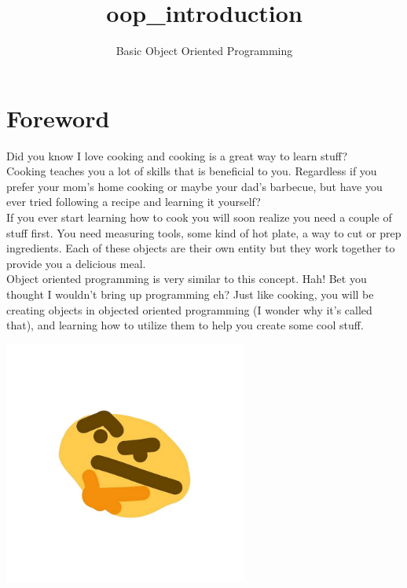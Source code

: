 \documentclass{42-en}
\begin{document}
                           \title{oop\_introduction}
                          \subtitle{Basic Object Oriented Programming}

\maketitle

\tableofcontents

\chapter{Foreword}

	Did you know I love cooking and cooking is a great way to learn stuff?\\

	Cooking teaches you a lot of skills that is beneficial to you. Regardless
	if you prefer your mom's home cooking or maybe your dad's barbecue, but
	have you ever tried following a recipe and learning it yourself?\\

	If you ever start learning how to cook you will soon realize you need a
	couple of stuff first. You need measuring tools, some kind of hot plate,
	a way to cut or prep ingredients. Each of these objects are their own
	entity but they work together to provide you a delicious meal.\\

	Object oriented programming is very similar to this concept. Hah! Bet you
	thought I wouldn't bring up programming eh? Just like cooking, you will
	be creating objects in objected oriented programming (I wonder why it's called
	that), and learning how to utilize them to help you create some cool stuff.\\

	\begin{center}
		\includegraphics[width=0.6\textwidth]{images/thonking.jpg}
	\end{center}
\end{document}
